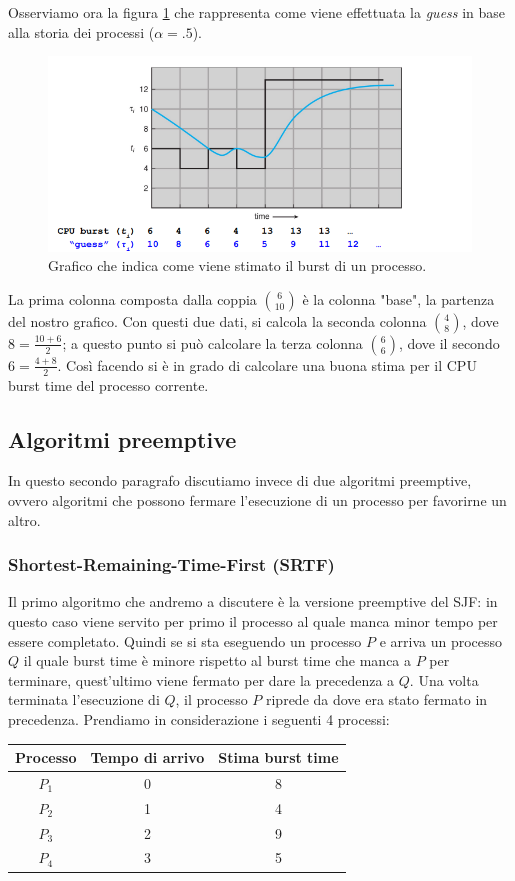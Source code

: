 Osserviamo ora la figura \ref{fig:CPU burst estimation} che rappresenta come viene effettuata la \textit{guess} in base alla storia dei processi ($\alpha = .5$).
\begin{figure}[h]
    \centering
    \includegraphics[width = .75\textwidth]{../res/imgs/CPU scheduling/CPU_burst_estimation.png}
    \caption{Grafico che indica come viene stimato il burst di un processo.}
    \label{fig:CPU burst estimation}
\end{figure}
La prima colonna composta dalla coppia $\binom{6}{10}$ è la colonna "base", la partenza del nostro grafico. Con questi due dati, si calcola la seconda colonna $\binom{4}{8}$, dove $ 8 = \frac{10 + 6}{2}$; a questo punto si può calcolare la terza colonna $\binom{6}{6}$, dove il secondo $6 = \frac{4 + 8}{2}$. Così facendo si è in grado di calcolare una buona stima per il CPU burst time del processo corrente.

% 
\subsection{Algoritmi preemptive}
In questo secondo paragrafo discutiamo invece di due algoritmi preemptive, ovvero algoritmi che possono fermare l'esecuzione di un processo per favorirne un altro.

% 
\subsubsection{Shortest-Remaining-Time-First (SRTF)}
Il primo algoritmo che andremo a discutere è la versione preemptive del SJF: in questo caso viene servito per primo il processo al quale manca minor tempo per essere completato. Quindi se si sta eseguendo un processo $P$ e arriva un processo $Q$ il quale burst time è minore rispetto al burst time che manca a $P$ per terminare, quest'ultimo viene fermato per dare la precedenza a $Q$. Una volta terminata l'esecuzione di $Q$, il processo $P$ riprede da dove era stato fermato in precedenza. Prendiamo in considerazione i seguenti 4 processi:
\begin{table}[h]
    \centering
    \begin{tabular}{c c c}
        \textbf{Processo} & \textbf{Tempo di arrivo} & \textbf{Stima burst time} \\\hline
        $P_1$ & 0 & 8 \\
        $P_2$ & 1 & 4 \\
        $P_3$ & 2 & 9 \\
        $P_4$ & 3 & 5 \\\hline
    \end{tabular}
\end{table}

